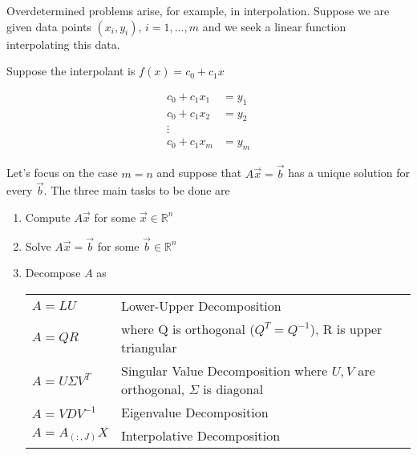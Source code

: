 \documentclass{article}
\begin{document}
Overdetermined problems arise, for example, in interpolation. Suppose we are given data points $(x_i, y_i),\, i=1, \ldots, m$ and we seek a linear function interpolating this data.  

Suppose the interpolant is $f(x) = c_0 + c_1 x$

\begin{align*}
    c_0 + c_1x_1 &= y_1 \\
    c_0 + c_1x_2 &= y_2 \\
    \vdots\\
    c_0+c_1x_m &= y_m
\end{align*}


\begin{center}
\end{center}
Let's focus on the case $m=n$ and suppose that $A\Vec{x} = \Vec{b}$ has a unique solution for every $\Vec{b}$. The three main tasks to be done are 

\begin{enumerate}[{label=\arabic*)}]
    \item Compute $A\Vec{x}$ for some $\Vec{x}\in\mathbb{R}^n$
    \item Solve $A\Vec{x}=\Vec{b}$ for some $\Vec{b}\in\mathbb{R}^n$
    \item Decompose $A$ as 
    
    \begin{tabular}{ll}
         $A=LU$ & Lower-Upper Decomposition  \\
         $A=QR$ & where Q is orthogonal ($Q^T=Q^{-1}$), R is upper triangular\\
         $A=U\Sigma V^T$ & Singular Value Decomposition where $U, V$ are orthogonal, $\Sigma$ is diagonal\\
         $A=VDV^{-1}$ & Eigenvalue Decomposition\\
         $A=A_{(:, J)}X$ & Interpolative Decomposition
    \end{tabular}
\end{enumerate}
\end{document}
